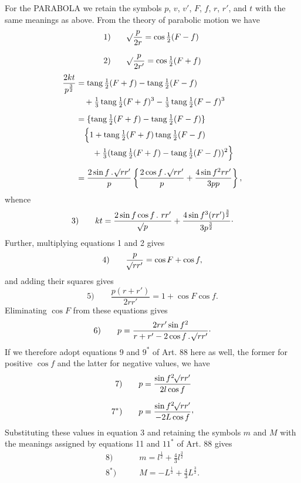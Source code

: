 For the PARABOLA we retain the symbols $p$, $v$, $v'$, $F$, $f$, $r$, $r'$, and $t$ with the same meanings as above. From the theory of parabolic motion we have
\[
\begin{aligned}
\mathrm{1)}\qquad&\mathord{{}^{}\!\surd}\dfrac p{2r}=\cos\tfrac12(F-f)\\[.7em]
\mathrm{2)}\qquad&\mathord{{}^{}\!\surd}\dfrac p{2r'}=\cos\tfrac12(F+f)
\end{aligned}
\]
\[
\begin{aligned}
\frac{2kt}{p^{\frac32}}&=\operatorname{tang}\tfrac12(F+f)-\operatorname{tang}\tfrac12(F-f)\\
&\quad+\tfrac13\operatorname{tang}\tfrac12(F+f)^3-\tfrac13\operatorname{tang}\tfrac12(F-f)^3\\[.5em]
&=\{\operatorname{tang}\tfrac12(F+f)-\operatorname{tang}\tfrac12(F-f)\}\\
&\quad\Bigl\{1+\operatorname{tang}\tfrac12(F+f)\operatorname{tang}\tfrac12(F-f)\\
&\qquad+\tfrac13(\operatorname{tang}\tfrac12(F+f)-\operatorname{tang}\tfrac12(F-f))^2\Bigr\}\\[.5em]
&=\frac{2\sin f\,\mathpunct{.}\mathord{{}^{}\!\surd}rr'}p
\left\{\frac{2\cos f\,\mathpunct{.}\mathord{{}^{}\!\surd}rr'}p+\frac{4\sin f^2rr'}{3pp}\right\},
\end{aligned}
\]
\noindent whence
\[
\mathrm{3)}\qquad kt=\frac{2\sin f\cos f\,\mathpunct{.}\,rr'}{\mathord{{}^{}\!\surd}p}+\frac{4\sin f^3(rr')^{\frac32}}{3p^{\frac32}}\mathpunct{\cdot}
\]
\noindent Further, multiplying equations 1 and 2 gives
\[
\mathrm{4)}\qquad \frac p{\mathord{{}^{}\!\surd}rr'}=\cos F+\cos f,
\]
\noindent and adding their squares gives
\[
\mathrm{5)}\qquad \frac{p(r+r')}{2rr'}=1+\cos F\cos f.
\]
\noindent Eliminating $\cos F$ from these equations gives
\[
\mathrm{6)}\qquad p=\frac{2rr'\sin f^2}{r+r'-2\cos f\,\mathpunct{.}\mathord{{}^{}\!\surd}rr'}\mathpunct{\cdot}
\]
\noindent If we therefore adopt equations 9 and $9^*$ of Art. 88 here as well, the former for positive $\cos f$ and the latter for negative values, we have
\[
\begin{aligned}
\mathrm{7)}\qquad&p=\frac{\sin f^2\BareRoot{rr'}}{2l\cos f}\\[.6em]
\mathrm{7^*)}\qquad&p=\frac{\sin f^2\BareRoot{rr'}}{-2L\cos f}\mathpunct{\raisebox{.45ex}{,}}
\end{aligned}
\]
\noindent Substituting these values in equation 3 and retaining the symbols $m$ and $M$ with the meanings assigned by equations 11 and $11^*$ of Art. 88 gives
\[
\begin{aligned}
\mathrm{8)}\qquad&m=l^{\frac12}+\tfrac43l^{\frac32}\\[.5em]
\mathrm{8^*)}\qquad&M=-L^{\frac12}+\tfrac43L^{\frac32}.
\end{aligned}
\]
